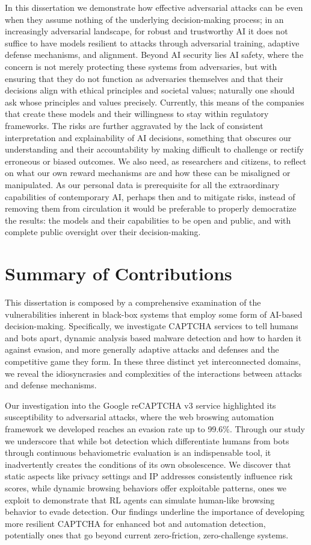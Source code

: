 In this dissertation we demonstrate how effective adversarial attacks can be even when they assume nothing of the underlying decision-making process; in an increasingly adversarial landscape, for robust and trustworthy \gls{AI} it does not suffice to have models resilient to attacks through adversarial training, adaptive defense mechanisms, and alignment.
Beyond AI security lies AI safety, where the concern is not merely protecting these systems from adversaries, but with ensuring that they do not function as adversaries themselves and that their decisions align with ethical principles and societal values; naturally one should ask whose principles and values precisely.
Currently, this means of the companies that create these models and their willingness to stay within  regulatory frameworks.
The risks are further aggravated by the lack of consistent interpretation and explainability of \gls{AI} decisions, something that obscures our understanding and their accountability by making difficult to challenge or rectify erroneous or biased outcomes.
We also need, as researchers and citizens, to reflect on what our own reward mechanisms are and how these can be misaligned or manipulated.
As our personal data is prerequisite for all the extraordinary capabilities of contemporary \gls{AI}, perhaps then and to mitigate risks, instead of removing them from circulation it would be preferable to properly democratize the results: the models and their capabilities to be open and public, and with complete public oversight over their decision-making.

\section{Summary of Contributions}
This dissertation is composed by a comprehensive examination of the vulnerabilities inherent in black-box systems that employ some form of AI-based decision-making.
Specifically, we investigate CAPTCHA services to tell humans and bots apart, dynamic analysis based malware detection and how to harden it against evasion, and more generally adaptive attacks and defenses and the competitive game they form.
In these three distinct yet interconnected domains, we reveal the idiosyncrasies and complexities of the interactions between attacks and defense mechanisms.

Our investigation into the Google reCAPTCHA v3 service highlighted its susceptibility to adversarial attacks, where the web broswing automation framework we developed reaches an evasion rate up to 99.6\%.
Through our study we underscore that while bot detection which differentiate humans from bots through continuous behaviometric evaluation is an indispensable tool, it inadvertently creates the conditions of its own obsolescence.
We discover that static aspects like privacy settings and IP addresses consistently influence risk scores, while dynamic browsing behaviors offer exploitable patterns, ones we exploit to demonstrate that \gls{RL} agents can simulate human-like browsing behavior to evade detection.
Our findings underline the importance of developing more resilient CAPTCHA for enhanced bot and automation detection, potentially ones that go beyond current zero-friction, zero-challenge systems.

